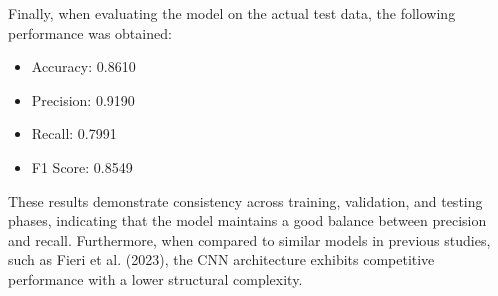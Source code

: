 Finally, when evaluating the model on the actual test data, the following performance was obtained:

\begin{itemize}
    \item Accuracy: 0.8610
    \item Precision: 0.9190
    \item Recall: 0.7991
    \item F1 Score: 0.8549
\end{itemize}

These results demonstrate consistency across training, validation, and testing phases, indicating that the model maintains a good balance between precision and recall. Furthermore, when compared to similar models in previous studies, such as Fieri et al. (2023), the CNN architecture exhibits competitive performance with a lower structural complexity.
